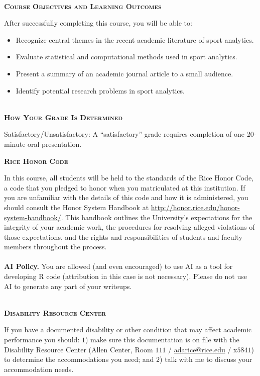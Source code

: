 \documentclass[11pt]{article}
\begin{document}
~\\
\textbf{\textsc{Course Objectives and Learning Outcomes}}
\begin{adjustwidth}{1cm}{0cm}
  After successfully completing this course, you will be able to:
  \begin{itemize}
    \item Recognize central themes in the recent academic literature of sport analytics.
    \item Evaluate statistical and computational methods used in sport analytics.
    \item Present a summary of an academic journal article to a small audience.
    \item Identify potential research problems in sport analytics.
  \end{itemize}
\end{adjustwidth}

~\\
\textbf{\textsc{How Your Grade Is Determined}}
\begin{adjustwidth}{1cm}{0cm}
  Satisfactory/Unsatisfactory: A ``satisfactory'' grade requires completion of one 20-minute oral presentation.
\end{adjustwidth}

\newpage
\textbf{\textsc{Rice Honor Code}}
\begin{adjustwidth}{1cm}{0cm}
  In this course, all students will be held to the standards of the Rice Honor Code, a code that you pledged to honor when you matriculated at this institution. If you are unfamiliar with the details of this code and how it is administered, you should consult the Honor System Handbook at \url{http://honor.rice.edu/honor-system-handbook/}. This handbook outlines the University's expectations for the integrity of your academic work, the procedures for resolving alleged violations of those expectations, and the rights and responsibilities of students and faculty members throughout the process.\\
  ~\\
  \textbf{AI Policy.} You are allowed (and even encouraged) to use AI as a tool for developing R code (attribution in this case is not necessary). Please do not use AI to generate any part of your writeups.
\end{adjustwidth}

~\\
\textbf{\textsc{Disability Resource Center}}
\begin{adjustwidth}{1cm}{0cm}
  If you have a documented disability or other condition that may affect academic performance you should: $1$) make sure this documentation is on file with the Disability Resource Center (Allen Center, Room $111$ / \href{mailto:adarice@rice.edu}{adarice@rice.edu} / x$5841$) to determine the accommodations you need; and $2$) talk with me to discuss your accommodation needs.
\end{adjustwidth}
\end{document}
